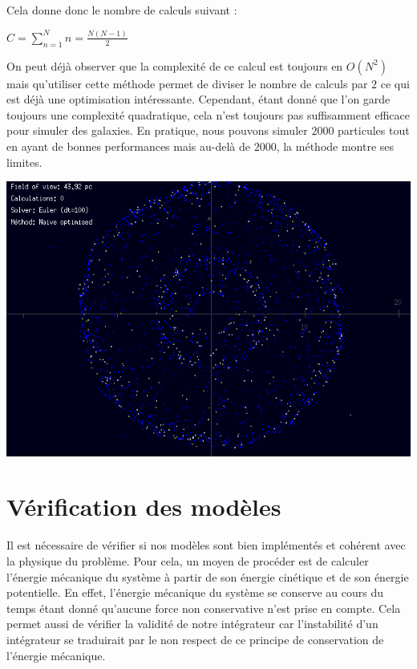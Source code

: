 \vspace{2mm}
Cela donne donc le nombre de calculs suivant :
\vspace{1mm}

$C=\sum_{n=1}^N n = \frac{N(N-1)}{2}$

\vspace{2mm}
On peut déjà observer que la complexité de ce calcul est toujours  en $O(N^2)$ mais qu'utiliser cette méthode permet de diviser le nombre de calculs par $2$ ce qui est déjà une optimisation intéressante. Cependant, étant donné que l'on garde toujours une complexité quadratique, cela n'est toujours pas suffisamment efficace pour simuler des galaxies. En pratique, nous pouvons simuler $2000$ particules tout en ayant de bonnes performances mais au-delà de $2000$, la méthode montre ses limites.

\begin{center}
\includegraphics[scale=0.8]{images/NO.png}
\captionsetup{hypcap=false}
\label{fig3}
\end{center} 

\section{Vérification des modèles}

Il est nécessaire de vérifier si nos modèles sont bien implémentés et cohérent avec la physique du problème. Pour cela, un moyen de procéder est de calculer l'énergie mécanique du système à partir de son énergie cinétique et de son énergie potentielle. En effet, l'énergie mécanique du système se conserve au cours du temps étant donné qu'aucune force non conservative n'est prise en compte.
Cela permet aussi de vérifier la validité de notre intégrateur car l'instabilité d'un intégrateur se traduirait par le non respect de ce principe de conservation de l'énergie mécanique.

